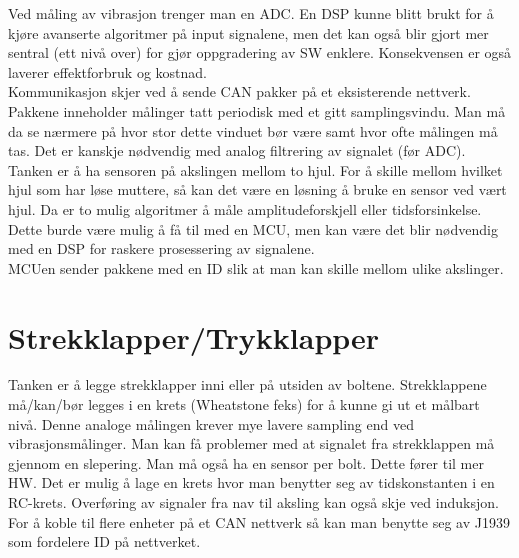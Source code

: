 Ved måling av vibrasjon trenger man en ADC. En DSP kunne blitt brukt for å kjøre
avanserte algoritmer på input signalene, men det kan også blir gjort mer sentral
(ett nivå over) for gjør oppgradering av SW enklere. Konsekvensen er også
laverer effektforbruk og kostnad. \\

Kommunikasjon skjer ved å sende CAN pakker på et eksisterende nettverk. Pakkene
inneholder målinger tatt periodisk med et gitt samplingsvindu. Man må da se
nærmere på hvor stor dette vinduet bør være samt hvor ofte målingen må tas. Det
er kanskje nødvendig med analog filtrering av signalet (før ADC). \\

Tanken er å ha sensoren på akslingen mellom to hjul. For å skille mellom hvilket
hjul som har løse muttere, så kan det være en løsning å bruke en sensor ved vært
hjul. Da er to mulig algoritmer å måle amplitudeforskjell eller
tidsforsinkelse. Dette burde være mulig å få til med en MCU, men kan være det
blir nødvendig med en DSP for raskere prosessering av signalene. \\

MCUen sender pakkene med en ID slik at man kan skille mellom ulike akslinger.

\section{Strekklapper/Trykklapper}

Tanken er å legge strekklapper inni eller på utsiden av boltene. Strekklappene
må/kan/bør legges i en krets (Wheatstone feks) for å kunne gi ut et målbart
nivå. Denne analoge målingen krever mye lavere sampling end ved vibrasjonsmålinger.
Man kan få problemer med at signalet fra strekklappen må gjennom en slepering.
Man må også ha en sensor per bolt. Dette fører til mer HW. Det er mulig å lage
en krets hvor man benytter seg av tidskonstanten i en RC-krets. Overføring av
signaler fra nav til aksling kan også skje ved induksjon. For å koble til flere
enheter på et CAN nettverk så kan man benytte seg av J1939 som fordelere ID på
nettverket.

